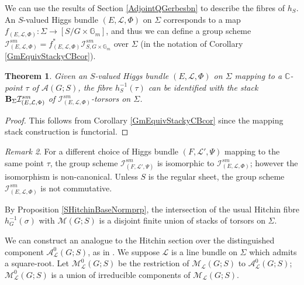 \documentclass{amsart}
\newtheorem{theorem}{Theorem}
\theoremstyle{remark}
\newtheorem{remark}[theorem]{Remark}
\numberwithin{theorem}{section}
\numberwithin{equation}{section}
\begin{document}
We can use the results of Section \ref{AdjointQGerbesbn} to describe the fibres of $h_S$. An $S$-valued Higgs bundle $(E,\mathcal L, \Phi)$ on $\Sigma$ corresponds to a map $f_{(E, \mathcal L, \Phi)}:\Sigma \rightarrow [S/G\times \mathbb{G}_m]$, and thus we can define a group scheme $\mathcal I^{sm}_{(E, \mathcal L, \Phi)} = f^*_{(E, \mathcal L, \Phi)}\mathcal I^{sm}_{S,G\times \mathbb{G}_m}$ over $\Sigma$ (in the notation of Corollary \ref{GmEquivStackyCBcor}).

\begin{theorem}\label{HiggsNonAbnthm}
         Given an $S$-valued Higgs bundle $(E, \mathcal L, \Phi)$ on $\Sigma$ mapping to a $\mathbb{C}$-point $\tau$ of $\mathcal A(G;S)$, the fibre $h_S^{-1}(\tau)$ can be identified with the stack ${\bf B}_{\Sigma} \mathcal I^{sm}_{(E, \mathcal L, \Phi)}$ of $\mathcal I^{sm}_{(E, \mathcal L, \Phi)}$-torsors on $\Sigma$.
\end{theorem}

\begin{proof}
This follows from Corollary \ref{GmEquivStackyCBcor} since the mapping stack construction is functorial. 
\end{proof}

\begin{remark}\label{HiggsNonAbnrmk}
    For a different choice of Higgs bundle $(F, \mathcal L', \Psi)$ mapping to the same point $\tau$, the group scheme $\mathcal I^{sm}_{(F, \mathcal L', \Psi)}$ is isomorphic to $\mathcal I^{sm}_{(E, \mathcal L, \Phi)}$; however the isomorphism is non-canonical. Unless $S$ is the regular sheet, the group scheme $\mathcal I^{sm}_{(E, \mathcal L, \Phi)}$ is not commutative. 

    By Proposition \ref{SHitchinBaseNormprp}, the intersection of the usual Hitchin fibre $h_G^{-1}(\sigma)$ with $\mathcal M(G;S)$ is a disjoint finite union of stacks of torsors on $\Sigma$. 
\end{remark}

We can construct an analogue to the Hitchin section over the distinguished component $\mathcal A^0_\mathcal L(G;S)$, as in \cite[Proposition 2.5]{Ngo1}. We suppose $\mathcal L$ is a line bundle on $\Sigma$ which admits a square-root. Let $\mathcal M_\mathcal L^0(G;S)$ be the restriction of $\mathcal M_\mathcal L(G;S)$ to $\mathcal A_\mathcal L^0(G;S)$; $\mathcal M_\mathcal L^0(G;S)$ is a union of irreducible components of $\mathcal M_{\mathcal L}(G;S)$.
\end{document}
